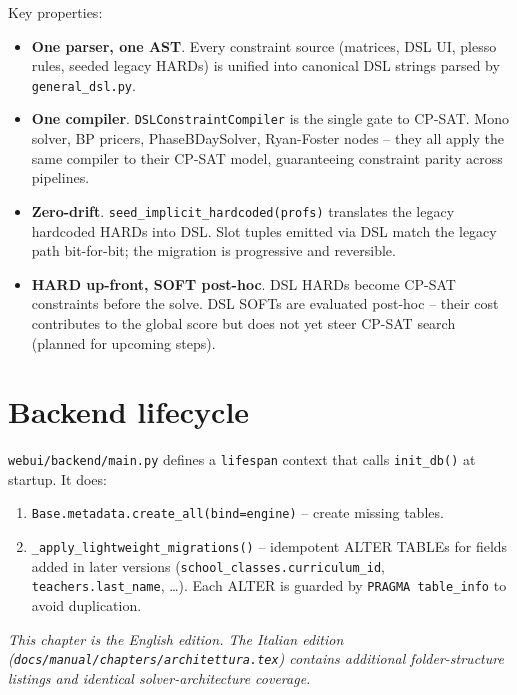 Key properties:
\begin{itemize}
\item \textbf{One parser, one AST}. Every constraint source
  (matrices, DSL UI, plesso rules, seeded legacy HARDs) is
  unified into canonical DSL strings parsed by
  \texttt{general\_dsl.py}.
\item \textbf{One compiler}. \texttt{DSLConstraintCompiler} is
  the single gate to CP-SAT. Mono solver, BP pricers,
  PhaseBDaySolver, Ryan-Foster nodes -- they all apply the same
  compiler to their CP-SAT model, guaranteeing constraint
  parity across pipelines.
\item \textbf{Zero-drift}.
  \texttt{seed\_implicit\_hardcoded(profs)} translates the
  legacy hardcoded HARDs into DSL. Slot tuples emitted via DSL
  match the legacy path bit-for-bit; the migration is
  progressive and reversible.
\item \textbf{HARD up-front, SOFT post-hoc}. DSL HARDs become
  CP-SAT constraints before the solve. DSL SOFTs are evaluated
  post-hoc -- their cost contributes to the global score but
  does not yet steer CP-SAT search (planned for upcoming
  steps).
\end{itemize}

\section{Backend lifecycle}

\texttt{webui/backend/main.py} defines a \texttt{lifespan}
context that calls \texttt{init\_db()} at startup. It does:

\begin{enumerate}
  \item \texttt{Base.metadata.create\_all(bind=engine)} -- create
        missing tables.
  \item \texttt{\_apply\_lightweight\_migrations()} -- idempotent
        ALTER TABLEs for fields added in later versions
        (\texttt{school\_classes.curriculum\_id},
        \texttt{teachers.last\_name}, \dots). Each ALTER is
        guarded by \texttt{PRAGMA table\_info} to avoid
        duplication.
\end{enumerate}

\medskip
\noindent
\textit{This chapter is the English edition. The Italian
edition (\texttt{docs/manual/chapters/architettura.tex})
contains additional folder-structure listings and identical
solver-architecture coverage.}
